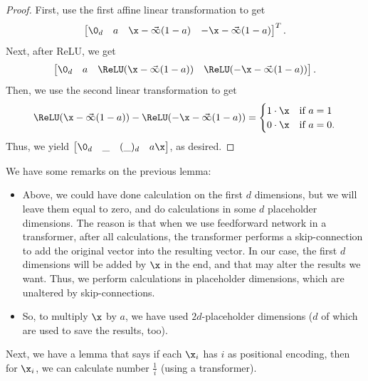 \begin{proof}
    First, use the first affine linear transformation to get $$\begin{bmatrix}
        \0_{d} &a &\x - \vec{\infty}(1-a) &-\x - \vec{\infty}(1-a)    
    \end{bmatrix}^T.$$ 
    Next, after ReLU, we get $$\begin{bmatrix}
        \0_d &a &\ReLU(\x -\vec{\infty} (1-a)) &\ReLU(-\x - \vec{\infty} (1-a))
    \end{bmatrix}.$$ Then, we use the second linear transformation to get 
    \begin{equation*}
        \ReLU(\x -\vec{\infty} (1-a)) - \ReLU(-\x - \vec{\infty} (1-a)) = \begin{cases}
            1 \cdot \x &\text{if $a=1$} \\
            0 \cdot \x &\text{if $a=0$}.
        \end{cases}
    \end{equation*}
    Thus, we yield $\begin{bmatrix}
        \0_d &\_ &(\_)_d &a \x
    \end{bmatrix}$, 
    as desired. 
\end{proof}

\begin{remark} We have some remarks on the previous lemma:
    \begin{itemize}
        \item Above, we could have done calculation on the first $d$ dimensions, but we will leave them equal to zero, and do calculations in some $d$ placeholder dimensions. The reason is that when we use feedforward network in a transformer, after all calculations, the transformer performs a skip-connection to add the original vector into the resulting vector. In our case, the first $d$ dimensions will be added by $\x$ in the end, and that may alter the results we want. Thus, we perform calculations in placeholder dimensions, which are unaltered by skip-connections.
        
        \item So, to multiply $\x$ by $a$, we have used $2d$-placeholder dimensions ($d$ of which are used to save the results, too).
    \end{itemize}
\end{remark}

Next, we have a lemma that says if each $\x_i$ has $i$ as positional encoding, then for $\x_i$, we can calculate number $\frac{1}{i}$ (using a transformer). 


